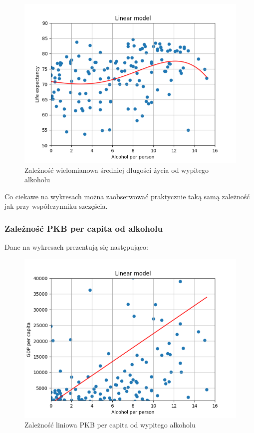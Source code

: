 \documentclass[10pt]{article}
\begin{document}
\begin{figure}[H]
    \begin{center}
        \includegraphics[width=0.8\linewidth]{plots/life_expectancy_dependence_poly.png}
        \caption{Zależność wielomianowa średniej długości życia od wypitego alkoholu}
    \end{center}
\end{figure}

Co ciekawe na wykresach można zaobserwować praktycznie taką samą zależność jak przy współczynniku szczęścia.

\pagebreak
\subsubsection{Zależność PKB per capita od alkoholu}
Dane na wykresach prezentują się następująco:

\begin{figure}[H]
    \begin{center}
        \includegraphics[width=0.8\linewidth]{plots/GDP_dependence_linear.png}
        \caption{Zależność liniowa PKB per capita od wypitego alkoholu}
    \end{center}
\end{figure}
\end{document}
